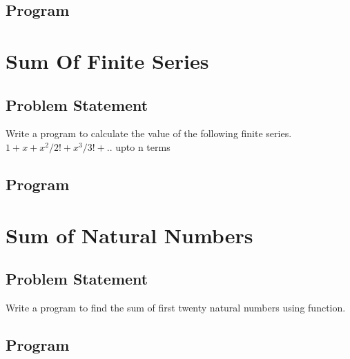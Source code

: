 \documentclass[11pt]{report}
\begin{document}
\section{Program}
        
        
\chapter{Sum Of Finite Series}
\section{Problem Statement}
Write a program to calculate the value of the following finite series.
$1+x+x^2/2!+x^3/3!+..$ upto n terms
\section{Program}


\chapter{Sum of Natural Numbers}
\section{Problem Statement}
Write a program to find the sum of first twenty natural numbers using function.
\section{Program}

\end{document}

